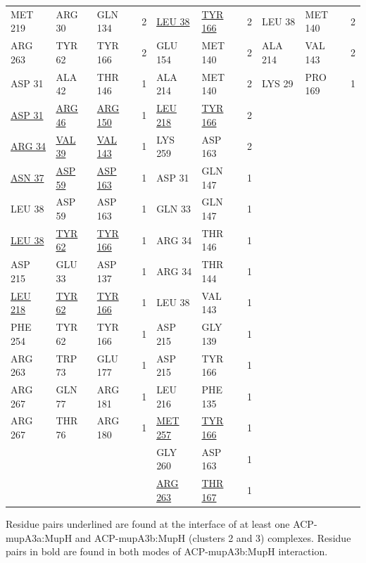\begin{table}
\begin{small}
\begin{center}
\begin{threeparttable}[b]
\begin{tabular}{l l l l l l l l l l}
			MET 219 & ARG 30 & GLN 134 & 2 & \underline{LEU 38} & \underline{TYR 166} & 2 & LEU 38 & MET 140 & 2 \\ 
			ARG 263 & TYR 62 & TYR 166 & 2 & GLU 154 & MET 140 & 2 & ALA 214 & VAL 143 & 2 \\ 
			ASP 31 & ALA 42 & THR 146 & 1 & ALA 214 & MET 140 & 2 & LYS 29 & PRO 169 & 1 \\ 
			\underline{ASP 31} & \underline{ARG 46} & \underline{ARG 150} & 1 & \underline{LEU 218} & \underline{TYR 166} & 2 &  &  &  \\ 
			\underline{ARG 34} & \underline{VAL 39} & \underline{VAL 143} & 1 & LYS 259 & ASP 163 & 2 &  &  &  \\ 
			\underline{ASN 37} & \underline{ASP 59} & \underline{ASP 163} & 1 & ASP 31 & GLN 147 & 1 &  &  &  \\ 
			LEU 38 & ASP 59 & ASP 163 & 1 & GLN 33 & GLN 147 & 1 &  &  &  \\ 
			\underline{LEU 38} & \underline{TYR 62} & \underline{TYR 166} & 1 & ARG 34 & THR 146 & 1 &  &  &  \\ 
			ASP 215 & GLU 33 & ASP 137 & 1 & ARG 34 & THR 144 & 1 &  &  &  \\ 
			\underline{LEU 218} & \underline{TYR 62} & \underline{TYR 166} & 1 & LEU 38 & VAL 143 & 1 &  &  &  \\ 
			PHE 254 & TYR 62 & TYR 166 & 1 & ASP 215 & GLY 139 & 1 &  &  &  \\ 
			ARG 263 & TRP 73 & GLU 177 & 1 & ASP 215 & TYR 166 & 1 &  &  &  \\ 
			ARG 267 & GLN 77 & ARG 181 & 1 & LEU 216 & PHE 135 & 1 &  &  &  \\ 
			ARG 267 & THR 76 & ARG 180 & 1 & \underline{MET 257} & \underline{TYR 166} & 1 &  &  &  \\ 
			 		&  	     & 		   &   & GLY 260 & ASP 163 & 1 &  &  &  \\ 
			        &        &         &   & \underline{ARG 263} & \underline{THR 167} & 1 &  &  &  \\ 
			\bottomrule[2pt]
			\end{tabular}
				\begin{tablenotes}
				\item[] Residue pairs underlined are found at the interface of at least one ACP-mupA3a:MupH and ACP-mupA3b:MupH (clusters 2 and 3) complexes. Residue pairs in bold are found in both modes of ACP-mupA3b:MupH interaction. 
				\end{tablenotes}
			\end{threeparttable}
			\end{center}
			\end{small}
			\end{table}
\newpage			
